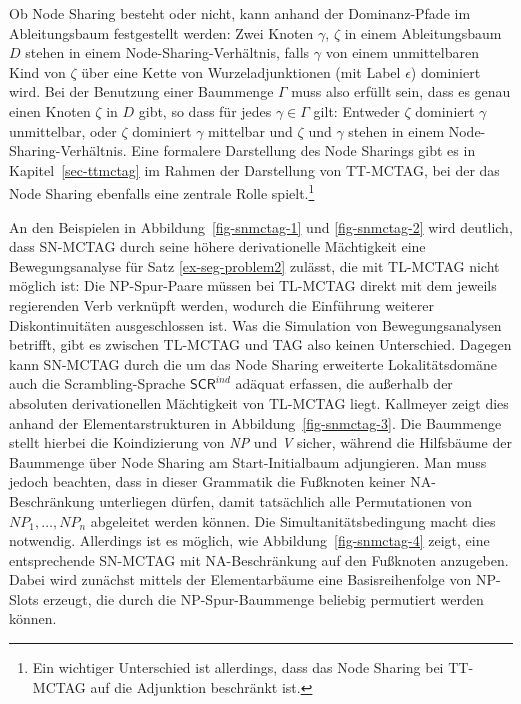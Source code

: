 Ob Node Sharing besteht oder nicht, kann anhand der Dominanz-Pfade im Ableitungsbaum festgestellt werden: Zwei Knoten $\gamma$, $\zeta$ in einem Ableitungsbaum $D$ stehen in einem Node-Sharing-Verhältnis, falls $\gamma$ von einem unmittelbaren Kind von $\zeta$ über eine Kette von Wurzeladjunktionen (mit Label $\epsilon$) dominiert wird. Bei der Benutzung einer Baummenge $\Gamma$ muss also erfüllt sein, dass es genau einen Knoten $\zeta$ in $D$ gibt, so dass für jedes $\gamma \in \Gamma$ gilt: Entweder $\zeta$ dominiert $\gamma$ unmittelbar, oder $\zeta$ dominiert $\gamma$ mittelbar und $\zeta$ und $\gamma$ stehen in einem Node-Sharing-Verhältnis. Eine formalere Darstellung des Node Sharings gibt es in Kapitel~\ref{sec-ttmctag} im Rahmen der Darstellung von TT-MCTAG, bei der das Node Sharing ebenfalls eine zentrale Rolle spielt.\footnote{Ein wichtiger Unterschied ist allerdings, dass das Node Sharing bei TT-MCTAG auf die Adjunktion beschränkt ist.} 

An den Beispielen in Abbildung~\ref{fig-snmctag-1} und \ref{fig-snmctag-2} wird deutlich, dass SN-MCTAG durch seine höhere derivationelle Mächtigkeit eine Bewegungsanalyse für Satz \ref{ex-seg-problem2} zulässt, die mit TL-MCTAG nicht möglich ist: Die NP-Spur-Paare müssen bei TL-MCTAG direkt mit dem jeweils regierenden Verb verknüpft werden, wodurch die Einführung weiterer Diskontinuitäten ausgeschlossen ist. Was die Simulation von Bewegungsanalysen betrifft, gibt es zwischen TL-MCTAG und TAG also keinen Unterschied. Dagegen kann SN-MCTAG durch die um das Node Sharing erweiterte Lokalitätsdomäne auch die Scrambling-Sprache $\mathsf{SCR}^{ind}$ adäquat erfassen, die au\ss erhalb der absoluten derivationellen Mächtigkeit von TL-MCTAG liegt. Kallmeyer zeigt dies anhand der Elementarstrukturen in Abbildung~\ref{fig-snmctag-3}. Die Baummenge stellt hierbei die Koindizierung von \textit{NP} und \textit{V} sicher, während die Hilfsbäume der Baummenge über Node Sharing am Start-Initialbaum adjungieren. Man muss jedoch beachten, dass in dieser Grammatik die Fu\ss knoten keiner NA-Beschränkung unterliegen dürfen, damit tatsächlich alle Permutationen von $\mathit{NP}_1, \ldots, \mathit{NP}_n$ abgeleitet werden können. Die Simultanitätsbedingung macht dies notwendig. Allerdings ist es möglich, wie Abbildung~\ref{fig-snmctag-4} zeigt, eine entsprechende SN-MCTAG mit NA-Beschränkung auf den Fu\ss knoten anzugeben. Dabei wird zunächst mittels der Elementarbäume eine Basisreihenfolge von NP-Slots erzeugt, die durch die NP-Spur-Baummenge beliebig permutiert werden können. 

